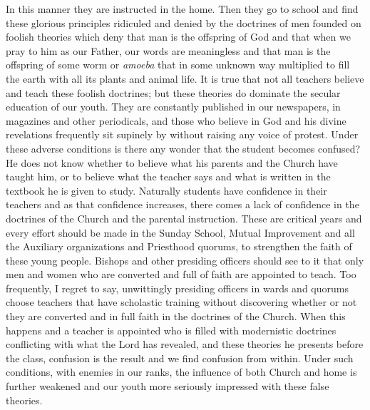 In this manner they are instructed in the home. Then they go to school and find these glorious
principles ridiculed and denied by the doctrines of men founded on foolish theories which
deny that man is the offspring of God and that when we pray to him as our Father, our words
are meaningless and that man is the offspring of some worm or \textit{amoeba} that in some
unknown way multiplied to fill the earth with all its plants and animal life. It is true that not
all teachers believe and teach these foolish doctrines; but these theories do dominate the
secular education of our youth. They are constantly published in our newspapers, in
magazines and other periodicals, and those who believe in God and his divine revelations
frequently sit supinely by without raising any voice of protest. Under these adverse
conditions is there any wonder that the student becomes confused? He does not know
whether to believe what his parents and the Church have taught him, or to believe what the
teacher says and what is written in the textbook he is given to study. Naturally students have
confidence in their teachers and as that confidence increases, there comes a lack of
confidence in the doctrines of the Church and the parental instruction. These are critical years
and every effort should be made in the Sunday School, Mutual Improvement and all the
Auxiliary organizations and Priesthood quorums, to strengthen the faith of these young
people. Bishops and other presiding officers should see to it that only men and women who
are converted and full of faith are appointed to teach. Too frequently, I regret to say,
unwittingly presiding officers in wards and quorums choose teachers that have scholastic
training without discovering whether or not they are converted and in full faith in the
doctrines of the Church. When this happens and a teacher is appointed who is filled with
modernistic doctrines conflicting with what the Lord has revealed, and these theories he
presents before the class, confusion is the result and we find confusion from within. Under
such conditions, with enemies in our ranks, the influence of both Church and home is further
weakened and our youth more seriously impressed with these false theories.

